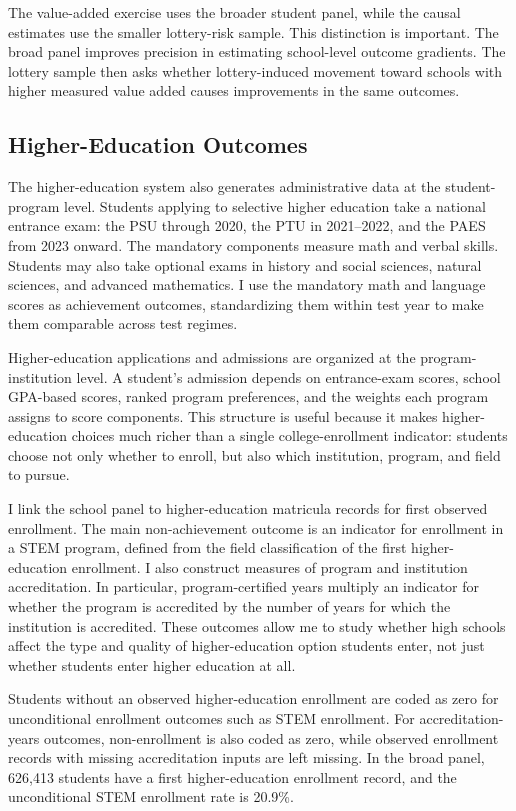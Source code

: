 \documentclass[a4paper, article, english, oneside, unknownkeysallowed, 12pt]{memoir}
\begin{document}
The value-added exercise uses the broader student panel, while the causal estimates use the smaller lottery-risk sample. This distinction is important. The broad panel improves precision in estimating school-level outcome gradients. The lottery sample then asks whether lottery-induced movement toward schools with higher measured value added causes improvements in the same outcomes.

\subsection{Higher-Education Outcomes}

The higher-education system also generates administrative data at the student-program level. Students applying to selective higher education take a national entrance exam: the PSU through 2020, the PTU in 2021--2022, and the PAES from 2023 onward. The mandatory components measure math and verbal skills. Students may also take optional exams in history and social sciences, natural sciences, and advanced mathematics. I use the mandatory math and language scores as achievement outcomes, standardizing them within test year to make them comparable across test regimes.

Higher-education applications and admissions are organized at the program-institution level. A student's admission depends on entrance-exam scores, school GPA-based scores, ranked program preferences, and the weights each program assigns to score components. This structure is useful because it makes higher-education choices much richer than a single college-enrollment indicator: students choose not only whether to enroll, but also which institution, program, and field to pursue.

I link the school panel to higher-education matricula records for first observed enrollment. The main non-achievement outcome is an indicator for enrollment in a STEM program, defined from the field classification of the first higher-education enrollment. I also construct measures of program and institution accreditation. In particular, program-certified years multiply an indicator for whether the program is accredited by the number of years for which the institution is accredited. These outcomes allow me to study whether high schools affect the type and quality of higher-education option students enter, not just whether students enter higher education at all.

Students without an observed higher-education enrollment are coded as zero for unconditional enrollment outcomes such as STEM enrollment. For accreditation-years outcomes, non-enrollment is also coded as zero, while observed enrollment records with missing accreditation inputs are left missing. In the broad panel, 626,413 students have a first higher-education enrollment record, and the unconditional STEM enrollment rate is 20.9\%.
\end{document}
